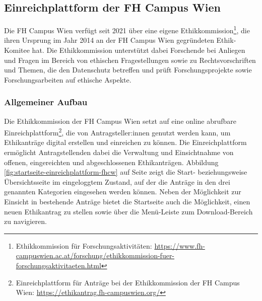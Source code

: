 \documentclass[a4paper,12pt,twoside]{scrreprt}
\begin{document}
\subsection{Einreichplattform der FH Campus Wien}
\label{sub-sec:einreichplattform-fh-campus-wien}

Die FH Campus Wien verfügt seit 2021 über eine eigene Ethikkommission\footnote{Ethikkommission für Forschungsaktivitäten: \url{https://www.fh-campuswien.ac.at/forschung/ethikkommission-fuer-forschungsaktivitaeten.html}}, die ihren Ursprung im Jahr 2014 an der FH Campus Wien gegründeten Ethik-Komitee hat. Die Ethikkommission unterstützt dabei Forschende bei Anliegen und Fragen im Bereich von ethischen Fragestellungen sowie zu Rechtsvorschriften und Themen, die den Datenschutz betreffen und prüft Forschungsprojekte sowie Forschungsarbeiten auf ethische Aspekte. \cite{fh_campus_wien_ethikkommission_2023}

\subsubsection*{Allgemeiner Aufbau}
\label{sub-sub-sec:fh-cw-allgemeiner-aufbau}

Die Ethikkommission der FH Campus Wien setzt auf eine online abrufbare Einreichplattform\footnote{Einreichplattform für Anträge bei der Ethikkommission der FH Campus Wien: \url{https://ethikantrag.fh-campuswien.org/}}, die von Antragsteller:innen genutzt werden kann, um Ethikanträge digital erstellen und einreichen zu können. \cite{ethikkommission_fh_campus_wien_fh_2023} Die Einreichplattform ermöglicht Antragstellenden dabei die Verwaltung und Einsichtnahme von offenen, eingereichten und abgeschlossenen Ethikanträgen. Abbildung \ref{fig:startseite-einreichplattform-fhcw} auf Seite \pageref{fig:startseite-einreichplattform-fhcw} zeigt die Start- beziehungsweise Übersichtsseite im eingeloggtem Zustand, auf der die Anträge in den drei genannten Kategorien eingesehen werden können. Neben der Möglichkeit zur Einsicht in bestehende Anträge bietet die Startseite auch die Möglichkeit, einen neuen Ethikantrag zu stellen sowie über die Menü-Leiste zum Download-Bereich zu navigieren.
\end{document}

